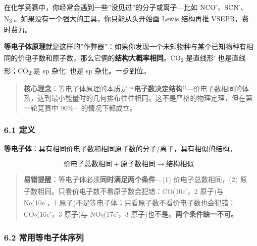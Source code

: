 \documentclass[a4paper,11pt]{ctexart}
\newcommand{\箭}{\ensuremath{\rightarrow}}
\newcommand{\左箭}{\ensuremath{\leftarrow}}
\newcommand{\上箭}{\ensuremath{\uparrow}}
\newcommand{\下箭}{\ensuremath{\downarrow}}
\newcommand{\衡}{\ensuremath{\rightleftharpoons}}
\newcommand{\双箭}{\ensuremath{\leftrightarrow}}
\newcommand{\约等于}{\ensuremath{\approx}}
\newcommand{\小于等于}{\ensuremath{\leq}}
\newcommand{\大于等于}{\ensuremath{\geq}}
\newcommand{\不等于}{\ensuremath{\neq}}
\newcommand{\西格马}{\ensuremath{\sigma}}
\newcommand{\派}{\ensuremath{\pi}}
\begin{document}
在化学竞赛中，你经常会遇到一些''没见过''的分子或离子---比如 NCO\textsuperscript{-}、SCN\textsuperscript{-}、N\textsubscript{3}\textsuperscript{-}。如果没有一个强大的工具，你只能从头开始画 Lewis 结构再推 VSEPR，费时费力。

\textbf{等电子体原理}就是这样的''作弊器''：如果你发现一个未知物种与某个已知物种有相同的价电子数和原子数，那么它俩的\textbf{结构大概率相同}。CO\textsubscript{2} 是直线形\textsuperscript{-} 也是直线形；CO\textsubscript{2} 是 sp 杂化\textsuperscript{-} 也是 sp 杂化。一步到位。

\begin{quote}
\textbf{核心理念}：等电子体原理的本质是 \textbf{``电子数决定结构''}---价电子数相同的体系，达到最小能量时的几何排布往往相同。这不是严格的物理定理，但在第一轮竞赛中 90\%+ 的情况下都成立。
\end{quote}

\subsubsection{6.1 定义}\label{ux5b9aux4e49}

\textbf{等电子体}：具有相同价电子数和相同原子数的分子/离子，具有相似的结构。

\[
\text{价电子总数相同} + \text{原子数相同} \rightarrow \text{结构相似}
\]

\begin{quote}
\textbf{易错提醒}：等电子体必须\textbf{同时满足两个条件}---(1) 价电子总数相同，(2) 原子数相同。只看价电子数不看原子数会犯错：CO(10e\textsuperscript{-}，2 原子)与 Ne(10e\textsuperscript{-}，1 原子)不是等电子体；只看原子数不看价电子数也会犯错：CO\textsubscript{2}(16e\textsuperscript{-}，3 原子)与 NO\textsubscript{2}(17e\textsuperscript{-}，3 原子)也不是。\textbf{两个条件缺一不可。}
\end{quote}

\subsubsection{6.2 常用等电子体序列}\label{ux5e38ux7528ux7b49ux7535ux5b50ux4f53ux5e8fux5217}
\end{document}
